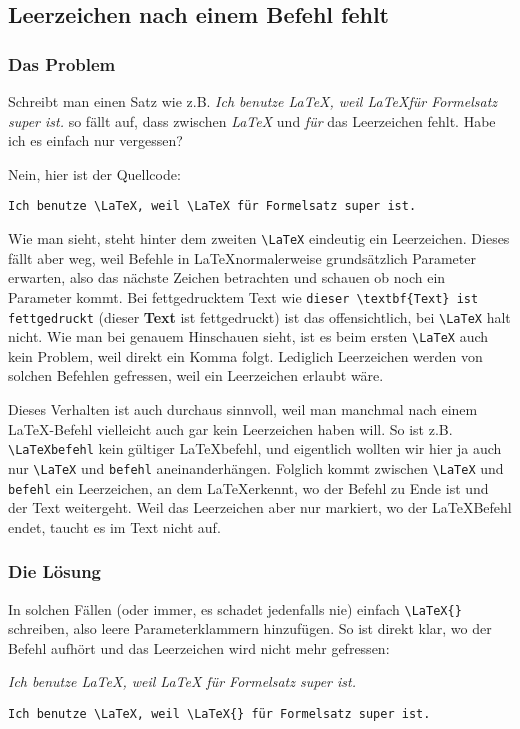 	
		\subsection{Leerzeichen nach einem Befehl fehlt}
			\subsubsection*{Das Problem}
				Schreibt man einen Satz wie z.B. \emph{Ich benutze \LaTeX, weil \LaTeX für Formelsatz super ist.} so fällt auf, dass zwischen \emph{\LaTeX{}} und \emph{für} das Leerzeichen fehlt.			
				Habe ich es einfach nur vergessen?
				
				Nein, hier ist der Quellcode:
				\bigskip
				
				\lstinline[language=thesis-latexbeispiel, showspaces=true]|Ich benutze \LaTeX, weil \LaTeX für Formelsatz super ist.|
				\bigskip
			
				Wie man sieht, steht hinter dem zweiten \lstinline[language=thesis-latexbeispiel]|\LaTeX| eindeutig ein Leerzeichen. Dieses fällt aber weg, weil Befehle in \LaTeX normalerweise grundsätzlich Parameter erwarten, also das nächste Zeichen betrachten und schauen ob noch ein Parameter kommt. Bei fettgedrucktem Text wie \lstinline[language=thesis-latexbeispiel]|dieser \textbf{Text} ist fettgedruckt| (dieser \textbf{Text} ist fettgedruckt) ist das offensichtlich, bei \lstinline[language=thesis-latexbeispiel]|\LaTeX| halt nicht. Wie man bei genauem Hinschauen sieht, ist es beim ersten \lstinline[language=thesis-latexbeispiel]|\LaTeX| auch kein Problem, weil direkt ein Komma folgt. Lediglich Leerzeichen werden von solchen Befehlen \glqq gefressen\grqq, weil ein Leerzeichen erlaubt wäre.
				
				Dieses Verhalten ist auch durchaus sinnvoll, weil man manchmal nach einem \LaTeX-Befehl vielleicht auch gar kein Leerzeichen haben will. So ist z.B. \lstinline|\LaTeXbefehl| kein gültiger \LaTeX befehl, und eigentlich wollten wir hier ja auch nur \lstinline[language=thesis-latexbeispiel]|\LaTeX| und \lstinline|befehl| aneinanderhängen. Folglich kommt zwischen \lstinline[language=thesis-latexbeispiel]|\LaTeX| und \lstinline|befehl| ein Leerzeichen, an dem \LaTeX erkennt, wo der Befehl zu Ende ist und der Text weitergeht. Weil das Leerzeichen aber nur markiert, wo der \LaTeX Befehl endet, taucht es im Text nicht auf.
			\subsubsection*{Die Lösung}
				In solchen Fällen (oder immer, es schadet jedenfalls nie) einfach \lstinline[language=thesis-latexbeispiel]|\LaTeX{}| schreiben, also leere Parameterklammern hinzufügen. So ist direkt klar, wo der Befehl aufhört und das Leerzeichen wird nicht mehr \glqq gefressen\grqq:
				\bigskip
				
				\emph{Ich benutze \LaTeX, weil \LaTeX{} für Formelsatz super ist.}
				\medskip
				
				\lstinline[language=thesis-latexbeispiel, showspaces=true]|Ich benutze \LaTeX, weil \LaTeX{} für Formelsatz super ist.|
